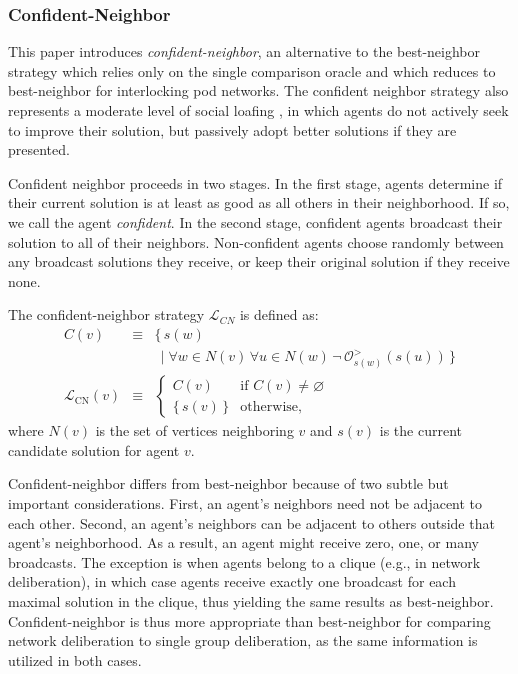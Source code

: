 \subsubsection{Confident-Neighbor}
This paper introduces {\em confident-neighbor}, an alternative to the best-neighbor strategy which relies only on the single comparison oracle and which reduces to best-neighbor for interlocking pod networks. The confident neighbor strategy also represents a moderate level of social loafing \cite{karau_social_1993}, in which agents do not actively seek to improve their solution, but passively adopt better solutions if they are presented.

Confident neighbor proceeds in two stages. In the first stage, agents determine if their current solution is at least as good as all others in their neighborhood. If so, we call the agent {\em confident}. In the second stage, confident agents broadcast their solution to all of their neighbors. Non-confident agents choose randomly between any broadcast solutions they receive, or keep their original solution if they receive none.

\begin{definition}
The confident-neighbor strategy $\mathcal{L}_{CN}$ is defined as:
\begin{eqnarray}
C(v) &\equiv& \{
\, s(w)  \nonumber \\
&& \,
\mid
\forall w \!\in\! N(v) \, \forall u \!\in\! N(w) \,
\lnot \, \mathcal{O}^{>}_{s(w)}(s(u)) \,
\}
\\
\mathcal{L}_{\text{CN}}(v)
&\equiv& 
\begin{cases}
C(v) & \text{if } C(v) \neq \varnothing \\
\{ \, s(v) \, \}& \text{otherwise,}
\end{cases}
\end{eqnarray}
where $N(v)$ is the set of vertices neighboring $v$ and $s(v)$ is the current candidate solution for agent $v$.
\end{definition}

Confident-neighbor differs from best-neighbor because of two subtle but important considerations. First, an agent's neighbors need not be adjacent to each other. Second, an agent's neighbors can be adjacent to others outside that agent's neighborhood. As a result, an agent might receive zero, one, or many broadcasts. The exception is when agents belong to a clique (e.g., in network deliberation), in which case agents receive exactly one broadcast for each maximal solution in the clique, thus yielding the same results as best-neighbor. Confident-neighbor is thus more appropriate than best-neighbor for comparing network deliberation to single group deliberation, as the same information is utilized in both cases.

